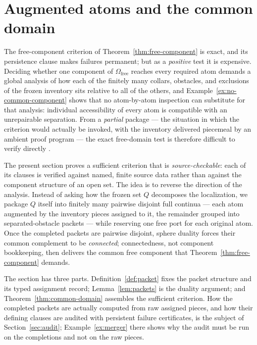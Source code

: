 \documentclass[11pt,reqno]{amsart}
\theoremstyle{definition}
\theoremstyle{remark}
\newcommand{\Omfree}{\Omega_{\mathrm{free}}}
\begin{document}

\section{Augmented atoms and the common domain}\label{sec:packets}

The free-component criterion of Theorem~\ref{thm:free-component} is exact, and its
persistence clause makes failures permanent; but as a \emph{positive} test it is
expensive. Deciding whether one component of $\Omfree$ reaches every required atom
demands a global analysis of how each of the finitely many collars, obstacles, and
exclusions of the frozen inventory sits relative to all of the others, and
Example~\ref{ex:no-common-component} shows that no atom-by-atom inspection can
substitute for that analysis: individual accessibility of every atom is compatible
with an unrepairable separation. From a \emph{partial} package --- the situation in
which the criterion would actually be invoked, with the inventory delivered piecemeal
by an ambient proof program --- the exact free-domain test is therefore difficult to
verify directly \cite{MWman}.

The present section proves a sufficient criterion that is \emph{source-checkable}:
each of its clauses is verified against named, finite source data rather than against
the component structure of an open set. The idea is to reverse the direction of the
analysis. Instead of asking how the frozen set $Q$ decomposes the localization, we
package $Q$ itself into finitely many pairwise disjoint full continua --- each atom
augmented by the inventory pieces assigned to it, the remainder grouped into
separated-obstacle packets --- while reserving one free port for each original atom.
Once the completed packets are pairwise disjoint, sphere duality forces their common
complement to be \emph{connected}; connectedness, not component bookkeeping, then
delivers the common free component that Theorem~\ref{thm:free-component} demands.

The section has three parts. Definition~\ref{def:packet} fixes the packet structure
and its typed assignment record; Lemma~\ref{lem:packets} is the duality argument; and
Theorem~\ref{thm:common-domain} assembles the sufficient criterion. How the completed
packets are actually computed from raw assigned pieces, and how their defining clauses
are audited with persistent failure certificates, is the subject of
Section~\ref{sec:audit}; Example~\ref{ex:merger} there shows why the audit must be run
on the completions and not on the raw pieces.
\end{document}
